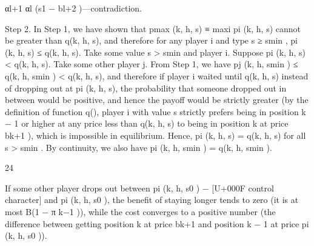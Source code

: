 \documentclass[10pt]{article}
\begin{document}
\begin{ReviewVerbatim}
αl+1
αl (s1 − bl+2 )—contradiction.

Step 2. In Step 1, we have shown that pmax (k, h, s) ≡ maxi pi (k, h, s) cannot be greater than
q(k, h, s), and therefore for any player i and type s ≥ smin , pi (k, h, s) ≤ q(k, h, s). Take some value
s > smin and player i. Suppose pi (k, h, s) < q(k, h, s). Take some other player j. From Step 1,
we have pj (k, h, smin ) ≤ q(k, h, smin ) < q(k, h, s), and therefore if player i waited until q(k, h, s)
instead of dropping out at pi (k, h, s), the probability that someone dropped out in between would
be positive, and hence the payoff would be strictly greater (by the definition of function q(), player
i with value s strictly prefers being in position k − 1 or higher at any price less than q(k, h, s) to
being in position k at price bk+1 ), which is impossible in equilibrium. Hence, pi (k, h, s) = q(k, h, s)
for all s > smin . By continuity, we also have pi (k, h, smin ) = q(k, h, smin ).

24

If some other player drops out between pi (k, h, s0 ) − [U+000F control character] and pi (k, h, s0 ), the benefit of staying longer tends to zero
(it is at most B(1 − π k−1 )), while the cost converges to a positive number (the difference between getting position k
at price bk+1 and position k − 1 at price pi (k, h, s0 )).
\end{ReviewVerbatim}
\end{document}
